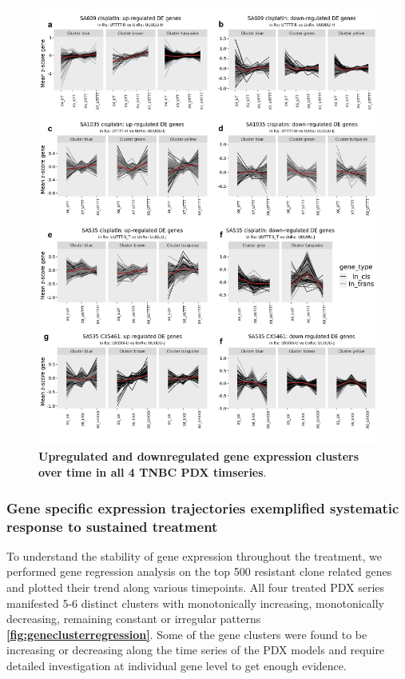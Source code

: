 \begin{figure}
\centering
 \includegraphics[width=\textwidth]{Figures/chap5/genesclustering_regression.pdf}
\caption[Gene expression changes over time]
	{\small
	 \textbf{Upregulated and downregulated gene expression clusters over time in all 4 TNBC PDX timseries}.
 }

	\label{fig:geneclusterregression}
\end{figure}


\subsubsection{Gene specific expression trajectories exemplified systematic response to sustained treatment}
To understand the stability of gene expression throughout the treatment, we performed gene regression analysis on the top 500 resistant clone related genes and plotted their trend along various timepoints. All four treated PDX series manifested 5-6 distinct clusters with monotonically increasing, monotonically decreasing, remaining constant or irregular patterns \textbf{\autoref{fig:geneclusterregression}}. Some of the gene clusters were found to be increasing or decreasing along the time series of the PDX models and require detailed investigation at individual gene level to get enough evidence.

